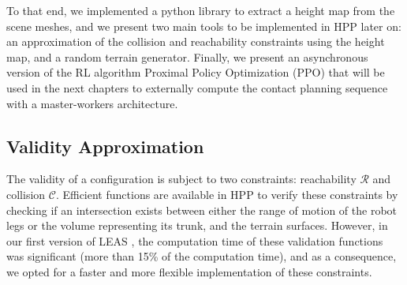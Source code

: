 To that end, we implemented a python library to extract a height map from the scene meshes, and we present two main tools to be implemented in HPP later on: an approximation of the collision and reachability constraints using the height map, and a random terrain generator. 
Finally, we present an asynchronous version of the RL algorithm Proximal Policy Optimization (PPO) \cite{PPO_2017} that will be used in the next chapters to externally compute the contact planning sequence with a master-workers architecture.

\subsection{Validity Approximation\label{subsub:validity_approximation}}
The validity of a configuration is subject to two constraints: reachability $\mathcal{R}$ and collision $\mathcal{C}$.
Efficient functions are available in HPP to verify these constraints by checking if an intersection exists between either the range of motion of the robot legs or the volume representing its trunk, and the terrain surfaces. 
However, in our first version of LEAS \cite{LEAS}, the computation time of these validation functions was significant (more than 15\% of the computation time), and as a consequence, we opted for a faster and more flexible implementation of these constraints.

